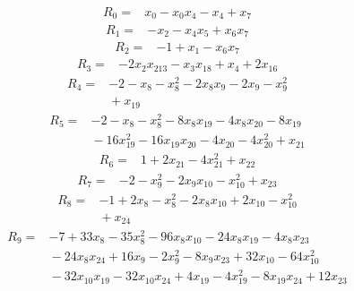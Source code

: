 {\small
\setlength{\jot}{2pt}
\allowdisplaybreaks[0]
\begin{align*}
R_{0} ={}& x_{0} - x_{0} x_{4} - x_{4} + x_{7}
\end{align*}
\begin{align*}
R_{1} ={}& -x_{2} - x_{4} x_{5} + x_{6} x_{7}
\end{align*}
\begin{align*}
R_{2} ={}& -1 + x_{1} - x_{6} x_{7}
\end{align*}
\begin{align*}
R_{3} ={}& -2x_{2} x_{213} - x_{3} x_{18} + x_{4} + 2x_{16}
\end{align*}
\begin{align*}
R_{4} ={}& -2 - x_{8} - x_{8}^{2} - 2x_{8} x_{9} - 2x_{9} - x_{9}^{2} \\
&{}  + x_{19}
\end{align*}
\begin{align*}
R_{5} ={}& -2 - x_{8} - x_{8}^{2} - 8x_{8} x_{19} - 4x_{8} x_{20} - 8x_{19} \\
&{}  - 16x_{19}^{2} - 16x_{19} x_{20} - 4x_{20} - 4x_{20}^{2} + x_{21}
\end{align*}
\begin{align*}
R_{6} ={}& 1 + 2x_{21} - 4x_{21}^{2} + x_{22}
\end{align*}
\begin{align*}
R_{7} ={}& -2 - x_{9}^{2} - 2x_{9} x_{10} - x_{10}^{2} + x_{23}
\end{align*}
\begin{align*}
R_{8} ={}& -1 + 2x_{8} - x_{8}^{2} - 2x_{8} x_{10} + 2x_{10} - x_{10}^{2} \\
&{}  + x_{24}
\end{align*}
\begin{align*}
R_{9} ={}& -7 + 33x_{8} - 35x_{8}^{2} - 96x_{8} x_{10} - 24x_{8} x_{19} - 4x_{8} x_{23} \\
&{}  - 24x_{8} x_{24} + 16x_{9} - 2x_{9}^{2} - 8x_{9} x_{23} + 32x_{10} - 64x_{10}^{2} \\
&{}  - 32x_{10} x_{19} - 32x_{10} x_{24} + 4x_{19} - 4x_{19}^{2} - 8x_{19} x_{24} + 12x_{23} \\

\end{align*}}
